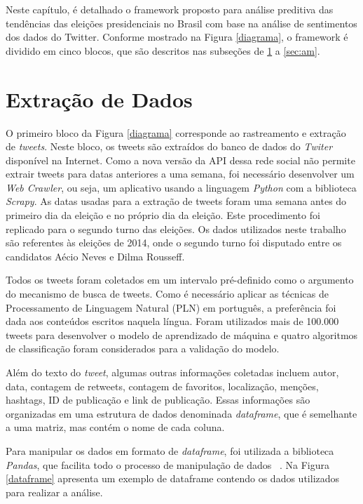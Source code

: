 Neste capítulo, é detalhado o framework proposto para análise
preditiva das tendências das eleições presidenciais no Brasil
com base na análise de sentimentos dos dados do Twitter.
Conforme mostrado na Figura \ref{diagrama}, o framework é dividido em
cinco blocos, que são descritos nas subseções de \ref{extract} a \ref{sec:am}.


%


\section{Extração de Dados}
\label{extract}

O primeiro bloco da Figura \ref{diagrama} corresponde ao rastreamento
e extração de \textit{tweets}. Neste bloco, os tweets são extraídos do
banco de dados do \textit{Twiter} disponível na Internet. Como a nova
versão da \acrshort{API} dessa rede social não permite extrair tweets para datas
anteriores a uma semana, foi necessário desenvolver um \textit{Web Crawler}, ou seja, um aplicativo usando a linguagem \textit{Python}
com a biblioteca \textit{Scrapy}. As datas usadas para a extração de
tweets foram uma semana antes do primeiro dia da eleição e no
próprio dia da eleição. Este procedimento foi replicado para
o segundo turno das eleições. Os dados utilizados neste trabalho são referentes às eleições de 2014, onde o segundo turno
foi disputado entre os candidatos Aécio Neves e Dilma Rousseff.


Todos os tweets foram coletados em um intervalo pré-definido
como o argumento do mecanismo de busca de tweets.
Como é necessário aplicar as técnicas de Processamento de
Linguagem Natural (PLN) em português, a preferência foi
dada aos conteúdos escritos naquela língua. Foram utilizados mais de 100.000 tweets para desenvolver o modelo de aprendizado de máquina e quatro algoritmos de classificação foram considerados para a validação do modelo.


Além do texto do \textit{tweet}, algumas outras informações coletadas
incluem autor, data, contagem de retweets, contagem de
favoritos, localização, menções, hashtags, ID de publicação e
link de publicação. Essas informações são organizadas em uma estrutura de dados denominada \textit{dataframe}, que é semelhante a uma matriz, mas contém o nome de cada 
coluna.


Para manipular os dados em formato de \textit{dataframe}, foi utilizada a biblioteca \textit{Pandas},
que facilita todo o processo de manipulação de dados ~\cite{mckinney2011pandas}. Na Figura \ref{dataframe} apresenta um exemplo de dataframe contendo os dados utilizados para realizar a análise.

